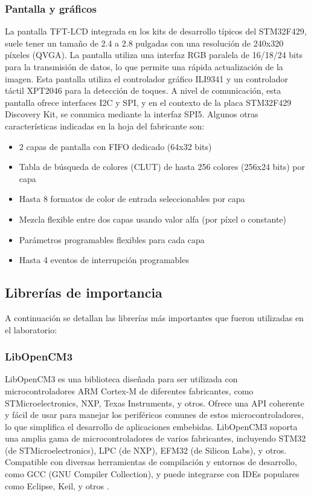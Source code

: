 \subsubsection{Pantalla y gráficos}
La pantalla TFT-LCD integrada en los kits de desarrollo típicos del STM32F429, suele tener un tamaño de 2.4 a 2.8 pulgadas con una resolución de 240x320 píxeles (QVGA). La pantalla utiliza una interfaz RGB paralela de 16/18/24 bits para la transmisión de datos, lo que permite una rápida actualización de la imagen. Esta pantalla utiliza el controlador gráfico ILI9341 y un controlador táctil XPT2046 para la detección de toques. A nivel de comunicación, esta pantalla ofrece interfaces I2C y SPI, y en el contexto de la placa STM32F429 Discovery Kit, se comunica mediante la interfaz SPI5. Algunos otras características indicadas en la hoja del fabricante \cite{ST} son:

\begin{itemize}
    \item 2 capas de pantalla con FIFO dedicado (64x32 bits)
    \item Tabla de búsqueda de colores (CLUT) de hasta 256 colores (256x24 bits) por capa
    \item Hasta 8 formatos de color de entrada seleccionables por capa
    \item Mezcla flexible entre dos capas usando valor alfa (por píxel o constante)
    \item Parámetros programables flexibles para cada capa
    \item Hasta 4 eventos de interrupción programables
\end{itemize}


\subsection{Librerías de importancia}

A continuación se detallan las librerías más importantes que fueron utilizadas en el laboratorio: 

\subsubsection{LibOpenCM3}

LibOpenCM3 es una biblioteca diseñada para ser utilizada con microcontroladores ARM Cortex-M de diferentes fabricantes, como STMicroelectronics, NXP, Texas Instruments, y otros. Ofrece una API coherente y fácil de usar para manejar los periféricos comunes de estos microcontroladores, lo que simplifica el desarrollo de aplicaciones embebidas. LibOpenCM3 soporta una amplia gama de microcontroladores de varios fabricantes, incluyendo STM32 (de STMicroelectronics), LPC (de NXP), EFM32 (de Silicon Labs), y otros. Compatible con diversas herramientas de compilación y entornos de desarrollo, como GCC (GNU Compiler Collection), y puede integrarse con IDEs populares como Eclipse, Keil, y otros \cite{libopencm3}. 

